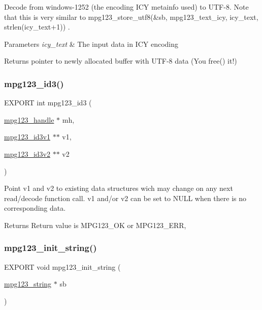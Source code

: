 Decode from windows-\/1252 (the encoding I\+CY metainfo used) to U\+T\+F-\/8. Note that this is very similar to mpg123\+\_\+store\+\_\+utf8(\&sb, mpg123\+\_\+text\+\_\+icy, icy\+\_\+text, strlen(icy\+\_\+text+1)) . 
\begin{DoxyParams}{Parameters}
{\em icy\+\_\+text} & The input data in I\+CY encoding \\
\hline
\end{DoxyParams}
\begin{DoxyReturn}{Returns}
pointer to newly allocated buffer with U\+T\+F-\/8 data (You free() it!) 
\end{DoxyReturn}
\mbox{\label{group__mpg123__metadata_ga2fa5ec6785ff317624fe53459538043d}} 
\subsubsection{\texorpdfstring{mpg123\+\_\+id3()}{mpg123\_id3()}}
{\footnotesize\ttfamily E\+X\+P\+O\+RT int mpg123\+\_\+id3 (\begin{DoxyParamCaption}\item[{\hyperlink{group__mpg123__init_ga6728e2839a395f3a07d4514da659faca}{mpg123\+\_\+handle} $\ast$}]{mh,  }\item[{\hyperlink{structmpg123__id3v1}{mpg123\+\_\+id3v1} $\ast$$\ast$}]{v1,  }\item[{\hyperlink{structmpg123__id3v2}{mpg123\+\_\+id3v2} $\ast$$\ast$}]{v2 }\end{DoxyParamCaption})}

Point v1 and v2 to existing data structures wich may change on any next read/decode function call. v1 and/or v2 can be set to N\+U\+LL when there is no corresponding data. \begin{DoxyReturn}{Returns}
Return value is M\+P\+G123\+\_\+\+OK or M\+P\+G123\+\_\+\+E\+RR, 
\end{DoxyReturn}
\mbox{\label{group__mpg123__metadata_ga4d9ddf9c9a074688d005873c22eade08}} 
\subsubsection{\texorpdfstring{mpg123\+\_\+init\+\_\+string()}{mpg123\_init\_string()}}
{\footnotesize\ttfamily E\+X\+P\+O\+RT void mpg123\+\_\+init\+\_\+string (\begin{DoxyParamCaption}\item[{\hyperlink{structmpg123__string}{mpg123\+\_\+string} $\ast$}]{sb }\end{DoxyParamCaption})}

